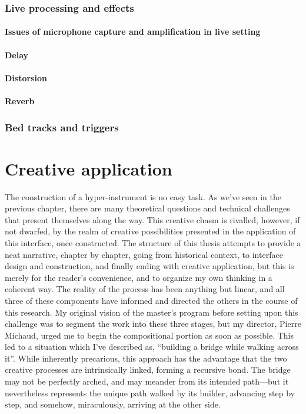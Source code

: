 \documentclass[12pt,twoside,maitrise]{dms}
\theoremstyle{definition}
\begin{document}
\subsection{Live processing and effects}

\subsubsection{Issues of microphone capture and amplification in live setting}

\subsubsection{Delay}

\subsubsection{Distorsion}

\subsubsection{Reverb}

\subsection{Bed tracks and triggers}

\chapter{Creative application}

The construction of a hyper-instrument is no easy task.
As we've seen in the previous chapter, there are many theoretical questions and technical challenges that present themselves along the way.
This creative chasm is rivalled, however, if not dwarfed, by the realm of creative possibilities presented in the application of this interface, once constructed.
The structure of this thesis attempts to provide a neat narrative, chapter by chapter, going from historical context, to interface design and construction, and finally ending with creative application, but this is merely for the reader's convenience, and to organize my own thinking in a coherent way.
The reality of the process has been anything but linear, and all three of these components have informed and directed the others in the course of this research.
My original vision of the master’s program before setting upon this challenge was to segment the work into these three stages, but my director, Pierre Michaud, urged me to begin the compositional portion as soon as possible.
This led to a situation which I’ve described as, “building a bridge while walking across it”.
While inherently precarious, this approach has the advantage that the two creative processes are intrinsically linked, forming a recursive bond.
The bridge may not be perfectly arched, and may meander from its intended path—but it nevertheless represents the unique path walked by its builder, advancing step by step, and somehow, miraculously, arriving at the other side.
\end{document}
